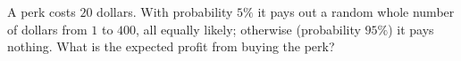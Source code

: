 A perk costs $20$ dollars. With probability $5\%$ it pays out a random whole number of dollars from $1$ to $400$, all equally likely; otherwise (probability $95\%$) it pays nothing. What is the expected profit from buying the perk?
